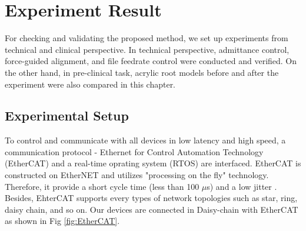 \chapter{Experiment Result}
\label{chapter6}
\hspace*{6mm}For checking and validating the proposed method, we set up experiments from technical and clinical perspective. In technical perspective, admittance control, force-guided alignment, and file feedrate control were conducted and verified. On the other hand, in pre-clinical task, acrylic root models before and after the experiment were also compared in this chapter. 
\section{Experimental Setup}
\hspace*{6mm}To control and communicate with all devices in low latency and high speed, a communication protocol - Ethernet for Control Automation Technology (EtherCAT) and a real-time oprating system (RTOS) are interfaced. EtherCAT is constructed on EtherNET and utilizes "processing on the fly" technology. Therefore, it provide a short cycle time (less than 100 $\mu$s) and a low jitter \cite{web5}. Besides, EhterCAT supports every types of network topologies such as star, ring, daisy chain, and so on.	 Our devices are connected in Daisy-chain with EtherCAT as shown in Fig \ref{fig:EtherCAT}.

